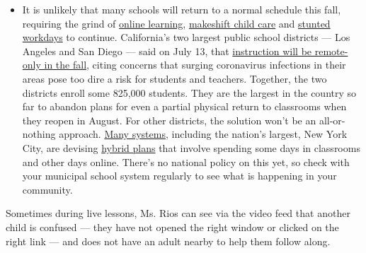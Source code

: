 \begin{itemize}
  \begin{itemize}
  \tightlist
  \item
    It is unlikely that many schools will return to a normal schedule
    this fall, requiring the grind of
    \href{https://www.nytimes3xbfgragh.onion/2020/06/05/us/coronavirus-education-lost-learning.html?action=click\&pgtype=Article\&state=default\&region=MAIN_CONTENT_3\&context=storylines_faq}{online
    learning},
    \href{https://www.nytimes3xbfgragh.onion/2020/05/29/us/coronavirus-child-care-centers.html?action=click\&pgtype=Article\&state=default\&region=MAIN_CONTENT_3\&context=storylines_faq}{makeshift
    child care} and
    \href{https://www.nytimes3xbfgragh.onion/2020/06/03/business/economy/coronavirus-working-women.html?action=click\&pgtype=Article\&state=default\&region=MAIN_CONTENT_3\&context=storylines_faq}{stunted
    workdays} to continue. California's two largest public school
    districts --- Los Angeles and San Diego --- said on July 13, that
    \href{https://www.nytimes3xbfgragh.onion/2020/07/13/us/lausd-san-diego-school-reopening.html?action=click\&pgtype=Article\&state=default\&region=MAIN_CONTENT_3\&context=storylines_faq}{instruction
    will be remote-only in the fall}, citing concerns that surging
    coronavirus infections in their areas pose too dire a risk for
    students and teachers. Together, the two districts enroll some
    825,000 students. They are the largest in the country so far to
    abandon plans for even a partial physical return to classrooms when
    they reopen in August. For other districts, the solution won't be an
    all-or-nothing approach.
    \href{https://bioethics.jhu.edu/research-and-outreach/projects/eschool-initiative/school-policy-tracker/}{Many
    systems}, including the nation's largest, New York City, are
    devising
    \href{https://www.nytimes3xbfgragh.onion/2020/06/26/us/coronavirus-schools-reopen-fall.html?action=click\&pgtype=Article\&state=default\&region=MAIN_CONTENT_3\&context=storylines_faq}{hybrid
    plans} that involve spending some days in classrooms and other days
    online. There's no national policy on this yet, so check with your
    municipal school system regularly to see what is happening in your
    community.
  \end{itemize}
\end{itemize}

Sometimes during live lessons, Ms. Rios can see via the video feed that
another child is confused --- they have not opened the right window or
clicked on the right link --- and does not have an adult nearby to help
them follow along.

